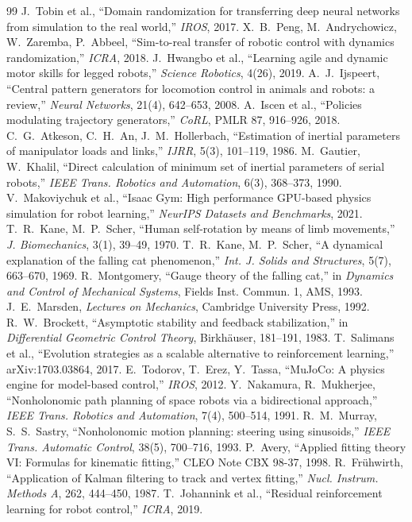 \documentclass[paper=a4paper,fontsize=10pt,twocolumn,column_gap=2zw,line_length=24zw,number_of_lines=46,head_space=20mm]{jlreq}
\begin{document}
\begin{thebibliography}{99}\footnotesize\setlength{\itemsep}{0pt}
 J.~Tobin et al., ``Domain randomization for transferring deep neural networks from simulation to the real world,'' \textit{IROS}, 2017.
 X.~B.~Peng, M.~Andrychowicz, W.~Zaremba, P.~Abbeel, ``Sim-to-real transfer of robotic control with dynamics randomization,'' \textit{ICRA}, 2018.
 J.~Hwangbo et al., ``Learning agile and dynamic motor skills for legged robots,'' \textit{Science Robotics}, 4(26), 2019.
 A.~J.~Ijspeert, ``Central pattern generators for locomotion control in animals and robots: a review,'' \textit{Neural Networks}, 21(4), 642--653, 2008.
 A.~Iscen et al., ``Policies modulating trajectory generators,'' \textit{CoRL}, PMLR 87, 916--926, 2018.
 C.~G.~Atkeson, C.~H.~An, J.~M.~Hollerbach, ``Estimation of inertial parameters of manipulator loads and links,'' \textit{IJRR}, 5(3), 101--119, 1986.
 M.~Gautier, W.~Khalil, ``Direct calculation of minimum set of inertial parameters of serial robots,'' \textit{IEEE Trans. Robotics and Automation}, 6(3), 368--373, 1990.
 V.~Makoviychuk et al., ``Isaac Gym: High performance GPU-based physics simulation for robot learning,'' \textit{NeurIPS Datasets and Benchmarks}, 2021.
 T.~R.~Kane, M.~P.~Scher, ``Human self-rotation by means of limb movements,'' \textit{J. Biomechanics}, 3(1), 39--49, 1970.
 T.~R.~Kane, M.~P.~Scher, ``A dynamical explanation of the falling cat phenomenon,'' \textit{Int. J. Solids and Structures}, 5(7), 663--670, 1969.
 R.~Montgomery, ``Gauge theory of the falling cat,'' in \textit{Dynamics and Control of Mechanical Systems}, Fields Inst. Commun. 1, AMS, 1993.
 J.~E.~Marsden, \textit{Lectures on Mechanics}, Cambridge University Press, 1992.
 R.~W.~Brockett, ``Asymptotic stability and feedback stabilization,'' in \textit{Differential Geometric Control Theory}, Birkhäuser, 181--191, 1983.
 T.~Salimans et al., ``Evolution strategies as a scalable alternative to reinforcement learning,'' arXiv:1703.03864, 2017.
 E.~Todorov, T.~Erez, Y.~Tassa, ``MuJoCo: A physics engine for model-based control,'' \textit{IROS}, 2012.
 Y.~Nakamura, R.~Mukherjee, ``Nonholonomic path planning of space robots via a bidirectional approach,'' \textit{IEEE Trans. Robotics and Automation}, 7(4), 500--514, 1991.
 R.~M.~Murray, S.~S.~Sastry, ``Nonholonomic motion planning: steering using sinusoids,'' \textit{IEEE Trans. Automatic Control}, 38(5), 700--716, 1993.
 P.~Avery, ``Applied fitting theory VI: Formulas for kinematic fitting,'' CLEO Note CBX 98-37, 1998.
 R.~Frühwirth, ``Application of Kalman filtering to track and vertex fitting,'' \textit{Nucl. Instrum. Methods A}, 262, 444--450, 1987.
 T.~Johannink et al., ``Residual reinforcement learning for robot control,'' \textit{ICRA}, 2019.
\end{thebibliography}
\end{document}
